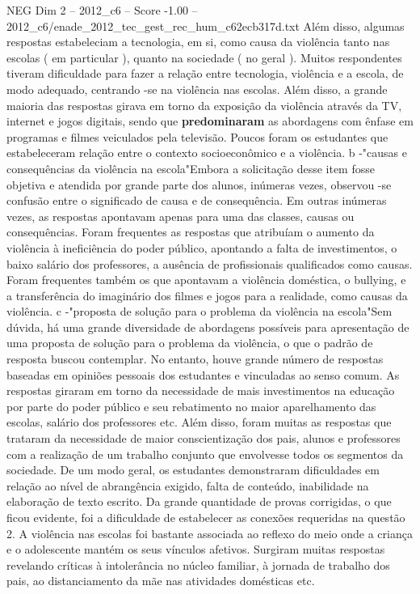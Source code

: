 \begin{textsample}{NEG Dim 2 – 2012\_c6 – Score -1.00 – 2012\_c6/enade\_2012\_tec\_gest\_rec\_hum\_c62ecb317d.txt}
Além disso, algumas respostas estabeleciam a tecnologia, em si, como causa da violência tanto nas escolas ( em particular ), quanto na sociedade ( no geral ).
Muitos respondentes tiveram dificuldade para fazer a relação entre tecnologia, violência e a escola, de modo adequado, centrando -se na violência nas escolas.
Além disso, a grande maioria das respostas girava em torno da exposição da violência através da TV, internet e jogos digitais, sendo que \textbf{predominaram} as abordagens com ênfase em programas e filmes veiculados pela televisão.
Poucos foram os estudantes que estabeleceram relação entre o contexto socioeconômico e a violência. b -"causas e consequências da violência na escola"Embora a solicitação desse item fosse objetiva e atendida por grande parte dos alunos, inúmeras vezes, observou -se confusão entre o significado de causa e de consequência.
Em outras inúmeras vezes, as respostas apontavam apenas para uma das classes, causas ou consequências.
Foram frequentes as respostas que atribuíam o aumento da violência à ineficiência do poder público, apontando a falta de investimentos, o baixo salário dos professores, a ausência de profissionais qualificados como causas.
Foram frequentes também os que apontavam a violência doméstica, o bullying, e a transferência do imaginário dos filmes e jogos para a realidade, como causas da violência. c -"proposta de solução para o problema da violência na escola"Sem dúvida, há uma grande diversidade de abordagens possíveis para apresentação de uma proposta de solução para o problema da violência, o que o padrão de resposta buscou contemplar.
No entanto, houve grande número de respostas baseadas em opiniões pessoais dos estudantes e vinculadas ao senso comum.
As respostas giraram em torno da necessidade de mais investimentos na educação por parte do poder público e seu rebatimento no maior aparelhamento das escolas, salário dos professores etc.
Além disso, foram muitas as respostas que trataram da necessidade de maior conscientização dos pais, alunos e professores com a realização de um trabalho conjunto que envolvesse todos os segmentos da sociedade.
De um modo geral, os estudantes demonstraram dificuldades em relação ao nível de abrangência exigido, falta de conteúdo, inabilidade na elaboração de texto escrito.
Da grande quantidade de provas corrigidas, o que ficou evidente, foi a dificuldade de estabelecer as conexões requeridas na questão 2.
A violência nas escolas foi bastante associada ao reflexo do meio onde a criança e o adolescente mantém os seus vínculos afetivos.
Surgiram muitas respostas revelando críticas à intolerância no núcleo familiar, à jornada de trabalho dos pais, ao distanciamento da mãe nas atividades domésticas etc.

\end{textsample}
